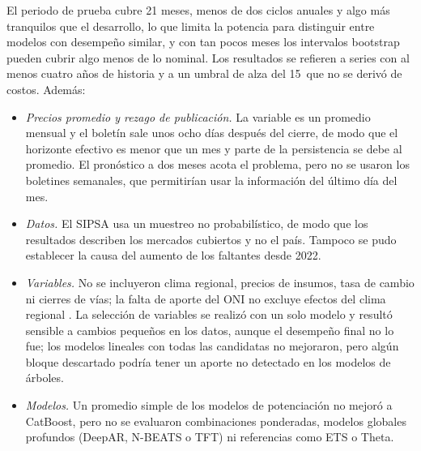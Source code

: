 El periodo de prueba cubre 21 meses, menos de dos ciclos anuales y algo más tranquilos que el desarrollo, lo que limita la potencia para distinguir entre modelos con desempeño similar, y con tan pocos meses los intervalos bootstrap pueden cubrir algo menos de lo nominal. Los resultados se refieren a series con al menos cuatro años de historia y a un umbral de alza del 15\pct\ que no se derivó de costos. Además:
\begin{itemize}[nosep]
\item \emph{Precios promedio y rezago de publicación.} La variable es un promedio mensual y el boletín sale unos ocho días después del cierre, de modo que el horizonte efectivo es menor que un mes y parte de la persistencia se debe al promedio. El pronóstico a dos meses acota el problema, pero no se usaron los boletines semanales, que permitirían usar la información del último día del mes.
\item \emph{Datos.} El SIPSA usa un muestreo no probabilístico, de modo que los resultados describen los mercados cubiertos y no el país. Tampoco se pudo establecer la causa del aumento de los faltantes desde 2022.
\item \emph{Variables.} No se incluyeron clima regional, precios de insumos, tasa de cambio ni cierres de vías; la falta de aporte del ONI no excluye efectos del clima regional \citep{bohorquez2026}. La selección de variables se realizó con un solo modelo y resultó sensible a cambios pequeños en los datos, aunque el desempeño final no lo fue; los modelos lineales con todas las candidatas no mejoraron, pero algún bloque descartado podría tener un aporte no detectado en los modelos de árboles.
\item \emph{Modelos.} Un promedio simple de los modelos de potenciación no mejoró a CatBoost, pero no se evaluaron combinaciones ponderadas, modelos globales profundos (DeepAR, N-BEATS o TFT) ni referencias como ETS o Theta.
\end{itemize}

\FloatBarrier
